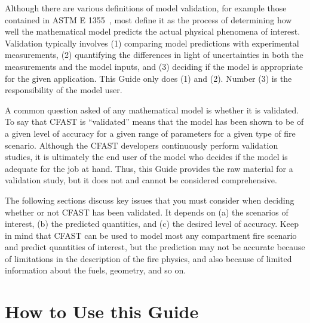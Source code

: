 Although there are various definitions of model validation, for example those contained in
ASTM E 1355~\cite{ASTM:E1355}, most define it as the process of determining how well the mathematical model
predicts the actual physical phenomena of interest.
Validation typically involves (1) comparing model predictions with experimental measurements, (2) quantifying the differences in light of uncertainties in
both the measurements and the model inputs, and (3) deciding if the model is appropriate for the given application. This Guide only does (1) and (2). Number (3) is
the responsibility of the model user.

A common question asked of any mathematical model is whether it is validated. To say that CFAST is
``validated'' means that the model has been shown to be of a given level of accuracy for a given range of parameters for a given
type of fire scenario. Although the CFAST developers continuously perform validation studies, it is ultimately the end user of the model who
decides if the model is adequate for the job at hand. Thus, this Guide provides the raw material for a validation study, but it does not
and cannot be considered comprehensive.

The following sections discuss key issues that you must consider when deciding whether or not CFAST has been validated. It depends on (a) the scenarios
of interest, (b) the predicted quantities, and (c) the desired level of accuracy. Keep in mind that CFAST can be used to model most any compartment fire scenario and predict 
quantities of interest, but the prediction may not be accurate because of limitations in the description of the fire physics, and also because of limited
information about the fuels, geometry, and so on.


\section{How to Use this Guide}

